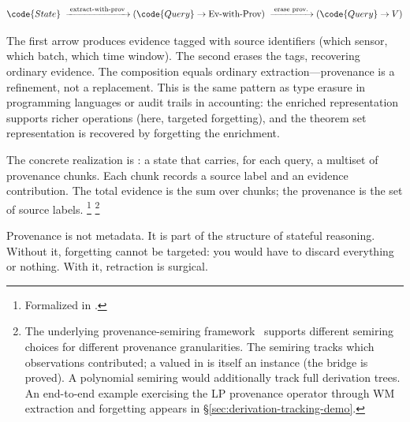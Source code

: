 \documentclass[11pt,openany]{report}
\begin{document}
\[
  \code{State}
  \;\xrightarrow{\;\text{extract-with-prov}\;}
  (\code{Query} \to \text{Ev-with-Prov})
  \;\xrightarrow{\;\text{erase prov.}\;}
  (\code{Query} \to V)
\]

\noindent
The first arrow produces evidence tagged with source identifiers
(which sensor, which batch, which time window).  The second erases
the tags, recovering ordinary evidence.  The composition equals
ordinary extraction---provenance is a refinement, not a replacement.
This is the same pattern as type erasure in programming languages or
audit trails in accounting: the enriched representation supports
richer operations (here, targeted forgetting), and the theorem set
representation is recovered by forgetting the enrichment.

The concrete realization is : a state that
carries, for each query, a multiset of provenance chunks.  Each chunk
records a source label and an evidence contribution.  The total
evidence is the sum over chunks; the provenance is the set of source
labels.%
\footnote{Formalized in
.}%
\footnote{The underlying provenance-semiring
framework~\cite{GreenKarvounarakisTannen2007} supports different
semiring choices for different provenance granularities.  The
 semiring tracks which observations contributed; a
 valued in  is itself an
 instance (the bridge is proved).  A
polynomial semiring would additionally track full derivation trees.
An end-to-end example exercising the LP provenance operator
 through WM extraction and forgetting
appears in \S\ref{sec:derivation-tracking-demo}.}

Provenance is not metadata.  It is part of the structure of stateful
reasoning.  Without it, forgetting cannot be targeted: you would have
to discard everything or nothing.  With it, retraction is surgical.

\end{document}

